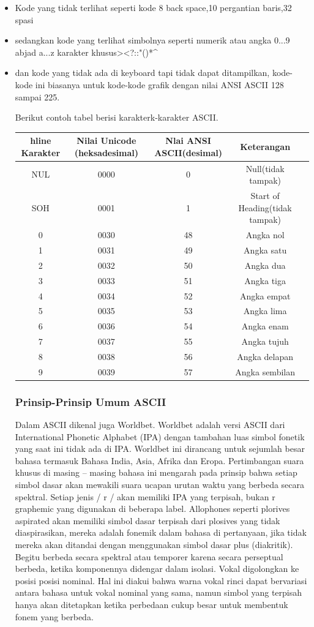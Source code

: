 	\begin{itemize}
		\item Kode yang tidak terlihat seperti kode 8 back space,10 pergantian baris,32 spasi 
		\item sedangkan kode yang terlihat simbolnya seperti numerik atau angka 0...9 abjad a...z karakter khusus><?::"{}()*^%
		\item dan kode yang tidak ada di keyboard tapi tidak dapat ditampilkan, kode-kode ini biasanya untuk kode-kode grafik dengan nilai ANSI ASCII 128 sampai 225.

	Berikut contoh tabel berisi karakterk-karakter ASCII.
\begin{table}[H]
\begin{tabular}{|c|c|c|c|c|}
hline
Karakter & Nilai Unicode (heksadesimal) & Nlai ANSI ASCII(desimal) & Keterangan\\
\hline
NUL & 0000 & 0 & Null(tidak tampak)\\
SOH & 0001 & 1 & Start of Heading(tidak tampak)\\
0 & 0030 & 48 & Angka nol\\
1 & 0031 & 49 & Angka satu\\
2 & 0032 & 50 & Angka dua\\
3 & 0033 & 51 & Angka tiga\\
4 & 0034 & 52 & Angka empat\\
5 & 0035 & 53 & Angka lima\\
6 & 0036 & 54 & Angka enam\\
7 & 0037 & 55 & Angka tujuh\\
8 & 0038 & 56 & Angka delapan\\
9 & 0039 & 57 & Angka sembilan\\
\hline
\end{tabular}
\end{table}

		\subsubsection{Prinsip-Prinsip Umum ASCII}
 	Dalam ASCII dikenal juga Worldbet. Worldbet adalah versi ASCII dari  International Phonetic Alphabet (IPA) dengan tambahan luas simbol fonetik yang saat ini tidak ada di IPA. Worldbet ini dirancang untuk sejumlah besar bahasa termasuk Bahasa India, Asia, Afrika dan Eropa. Pertimbangan suara khusus di masing – masing bahasa ini mengarah pada prinsip bahwa setiap simbol dasar akan mewakili suara ucapan urutan waktu yang berbeda secara spektral. Setiap jenis / r / akan memiliki IPA yang terpisah, bukan r graphemic yang digunakan di beberapa label. Allophones seperti plorives aspirated akan memiliki simbol dasar terpisah dari plosives yang tidak diaspirasikan, mereka adalah fonemik dalam bahasa di pertanyaan, jika tidak mereka akan ditandai dengan menggunakan simbol dasar plus (diakritik). Begitu berbeda secara spektral atau temporer karena secara perseptual berbeda, ketika komponennya didengar dalam isolasi. Vokal digolongkan ke posisi posisi nominal. Hal ini diakui bahwa warna vokal rinci dapat bervariasi antara bahasa untuk vokal nominal yang sama, namun simbol yang terpisah hanya akan ditetapkan ketika perbedaan cukup besar untuk membentuk fonem yang berbeda.
 

\end{itemize}

